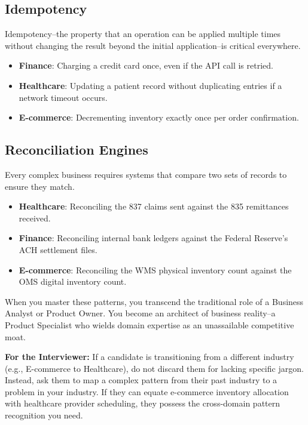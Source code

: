\documentclass[
  11pt,
  openany,
  oneside]{book}
\providecommand{\tightlist}{%
  \setlength{\itemsep}{0pt}\setlength{\parskip}{0pt}}
\renewenvironment{quote}{\begin{customquote}}{\end{customquote}}
\begin{document}
\subsection{Idempotency}\label{idempotency}

Idempotency--the property that an operation can be applied multiple
times without changing the result beyond the initial application--is
critical everywhere.

\begin{itemize}
\tightlist
\item
  \textbf{Finance}: Charging a credit card once, even if the API call is
  retried.
\item
  \textbf{Healthcare}: Updating a patient record without duplicating
  entries if a network timeout occurs.
\item
  \textbf{E-commerce}: Decrementing inventory exactly once per order
  confirmation.
\end{itemize}

\subsection{Reconciliation Engines}\label{reconciliation-engines}

Every complex business requires systems that compare two sets of records
to ensure they match.

\begin{itemize}
\tightlist
\item
  \textbf{Healthcare}: Reconciling the 837 claims sent against the 835
  remittances received.
\item
  \textbf{Finance}: Reconciling internal bank ledgers against the
  Federal Reserve's ACH settlement files.
\item
  \textbf{E-commerce}: Reconciling the WMS physical inventory count
  against the OMS digital inventory count.
\end{itemize}

When you master these patterns, you transcend the traditional role of a
Business Analyst or Product Owner. You become an architect of business
reality--a Product Specialist who wields domain expertise as an
unassailable competitive moat.

\begin{quote}
\textbf{For the Interviewer:} If a candidate is transitioning from a
different industry (e.g., E-commerce to Healthcare), do not discard them
for lacking specific jargon. Instead, ask them to map a complex pattern
from their past industry to a problem in your industry. If they can
equate e-commerce inventory allocation with healthcare provider
scheduling, they possess the cross-domain pattern recognition you need.
\end{quote}
\end{document}
